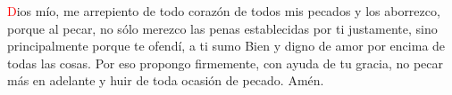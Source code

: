 \textcolor{red}{D}ios mío, me arrepiento de todo corazón de todos mis pecados y los aborrezco, porque al pecar, no sólo merezco las penas establecidas 
por ti justamente, sino principalmente porque te ofendí, a ti sumo Bien y digno de amor por encima de todas las cosas. Por eso propongo firmemente, 
con ayuda de tu gracia, no pecar más en adelante y huir de toda ocasión de pecado. Amén.